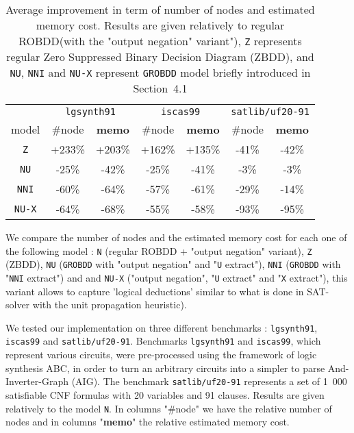 \documentclass[a4paper,10pt]{article}
\newcommand{\uextract}{"\texttt{U} extract"}
\newcommand{\nniextract}{"\texttt{NNI} extract"}
\newcommand{\xextract}{"\texttt{X} extract"}
\newcommand{\GroBdd}{\texttt{GROBDD}}
\begin{document}
\begin{table}
\center
\begin{tabular}{c | c | c | c | c | c | c }
& \multicolumn{2}{c|}{\texttt{lgsynth91}} & \multicolumn{2}{c|}{\texttt{iscas99}} & \multicolumn{2}{c}{\texttt{satlib/uf20-91}} \\
model         & \#node & \textbf{memo} & \#node & \textbf{memo} & \#node & \textbf{memo} \\
\texttt{Z}    & +233\% & +203\%        & +162\% & +135\%        & -41\%  & -42\%         \\
\texttt{NU}   & -25\%  & -42\%         & -25\%  & -41\%         & -3\%   & -3\%          \\
\texttt{NNI}  & -60\%  & -64\%         & -57\%  & -61\%         & -29\%  & -14\%         \\
\texttt{NU-X} & -64\%  & -68\%         & -55\%  & -58\%         & -93\%  & -95\%         \\
\end{tabular}
\caption{Average improvement in term of number of nodes and estimated memory cost. Results are given relatively to regular ROBDD(with the "output negation" variant"), \texttt{Z} represents regular Zero Suppressed Binary Decision Diagram (ZBDD), and \texttt{NU}, \texttt{NNI} and \texttt{NU-X} represent \GroBdd{} model briefly introduced in Section~4.1}
\label{results}
\end{table}

We compare the number of nodes and the estimated memory cost for each one of the following model : \texttt{N} (regular ROBDD + "output negation" variant), \texttt{Z} (ZBDD), \texttt{NU} (\GroBdd{} with "output negation" and \uextract{}), \texttt{NNI} (\GroBdd{} with \nniextract{}) and and \texttt{NU-X} ("output negation", \uextract{} and \xextract{}), this variant allows to capture 'logical deductions' similar to what is done in SAT-solver with the unit propagation heuristic).

We tested our implementation on three different benchmarks : \texttt{lgsynth91}\cite{BenchLgsynth91}, \texttt{iscas99}\cite{BenchIscas99} and \texttt{satlib/uf20-91}\cite{BenchSatlib}.
Benchmarks \texttt{lgsynth91} and \texttt{iscas99}, which represent various circuits, were pre-processed using the framework of logic synthesis ABC\cite{Abc}, in order to turn an arbitrary circuits into a simpler to parse And-Inverter-Graph (AIG).
The benchmark \texttt{satlib/uf20-91} represents a set of 1~000 satisfiable CNF formulas with 20 variables and 91 clauses.
Results are given relatively to the model \texttt{N}.
In columns "\#node" we have the relative number of nodes and in columns "\textbf{memo}" the relative estimated memory cost.
\end{document}
